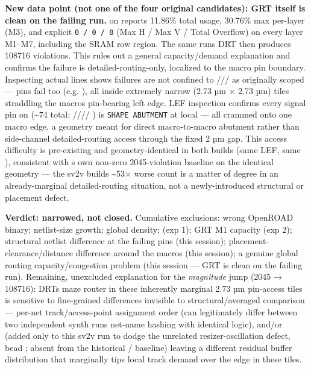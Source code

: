 \begin{record}
\textbf{New data point (not one of the four original candidates): GRT
itself is clean on the failing run.}
 on
 reports 11.86\% total usage, 30.76\% max
per-layer (M3), and explicit
\texttt{0\ /\allowbreak{}\ 0\ /\allowbreak{}\ 0} (Max H / Max V / Total
Overflow) on every layer M1--M7, including the SRAM row region. The same
run\textquotesingle s DRT then produces 108716 violations. This rules
out a general capacity/\allowbreak{}demand explanation and confirms the
failure is detailed-routing-only, localized to the macro pin boundary.
Inspecting actual  lines shows failures are not confined
to /// as originally scoped
---  pins fail too (e.g.
), all
inside extremely narrow (2.73 µm × 2.73 µm)  tiles
straddling the macro\textquotesingle s pin-bearing left edge. LEF
inspection confirms every signal pin on 
(\textasciitilde74 total:
//// ) is
\texttt{SHAPE\ ABUTMENT} at local  --- all crammed
onto one macro edge, a geometry meant for direct macro-to-macro abutment
rather than side-channel detailed-routing access through the fixed 2 µm
 gap. This access difficulty is pre-existing
and geometry-identical in both builds (same LEF, same
), consistent with
\textquotesingle s own non-zero 2045-violation baseline on the
identical geometry --- the sv2v build\textquotesingle s
\textasciitilde53× worse count is a matter of degree in an
already-marginal detailed-routing situation, not a newly-introduced
structural or placement defect.

\textbf{Verdict: narrowed, not closed.} Cumulative exclusions: wrong
OpenROAD binary; netlist-size growth; global density;
 (exp 1); GRT M1 capacity (exp 2); structural
netlist difference at the failing pins (this session);
placement-clearance/\allowbreak{}distance difference around the macros
(this session); a genuine global routing
capacity/\allowbreak{}congestion problem (this session --- GRT is clean
on the failing run). Remaining, unexcluded explanation for the
\emph{magnitude} jump (2045 → 108716): DRT\textquotesingle s maze router
in these inherently marginal 2.73 µm pin-access tiles is sensitive to
fine-grained differences invisible to structural/\allowbreak{}averaged
comparison --- per-net track/\allowbreak{}access-point assignment order
(can legitimately differ between two independent synth
runs\textquotesingle{} net-name hashing with identical logic), and/or
 (added only to this sv2v run to
dodge the unrelated resizer-oscillation defect, bead ; absent
from the historical / baseline) leaving
a different residual buffer distribution that marginally tips local
track demand over the edge in these tiles.


\end{record}
